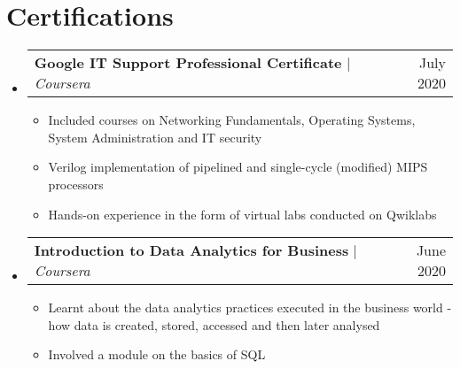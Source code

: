 \documentclass[a4paper,11pt]{article}
\makeatletter
\newcommand{\resumeItem}[1]{
  \item\small{
    {#1 \vspace{-2pt}}
  }
}
\newcommand{\resumeProjectHeading}[2]{
    \item
    \begin{tabular*}{0.97\textwidth}{l@{\extracolsep{\fill}}r}
      \small#1 & #2 \\
    \end{tabular*}\vspace{-7pt}
}
\newcommand{\resumeSubHeadingListStart}{\begin{itemize}[leftmargin=0.15in, label={}]}
\newcommand{\resumeSubHeadingListEnd}{\end{itemize}}
\newcommand{\resumeItemListStart}{\begin{itemize}}
\newcommand{\resumeItemListEnd}{\end{itemize}\vspace{-5pt}}
\makeatother
\begin{document}
\section{Certifications}
    \resumeSubHeadingListStart
      \resumeProjectHeading
          {\textbf{Google IT Support Professional Certificate} $|$ \emph{Coursera}}{July 2020}
          \resumeItemListStart
            \resumeItem{Included courses on Networking Fundamentals, Operating Systems, System Administration and IT security}
            \resumeItem{Verilog implementation of pipelined and single-cycle (modified) MIPS processors}
            \resumeItem{Hands-on experience in the form of virtual labs conducted on Qwiklabs}
          \resumeItemListEnd
      \resumeProjectHeading
          {\textbf{Introduction to Data Analytics for Business} $|$ \emph{Coursera}}{June 2020}
          \resumeItemListStart
            \resumeItem{Learnt about the data analytics practices executed in the business world - how data is created, stored, accessed and then later analysed}
            \resumeItem{Involved a module on the basics of SQL}
          \resumeItemListEnd
    \resumeSubHeadingListEnd
\end{document}
